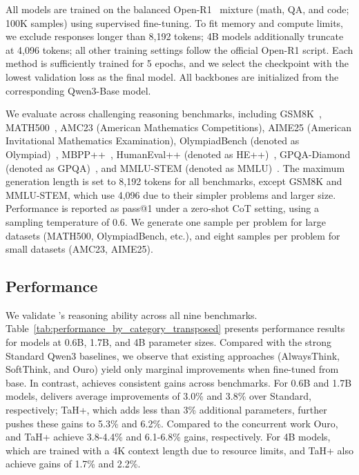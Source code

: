 All models are trained on the balanced Open-R1~\citep{openr1} mixture (math, QA, and code; 100K samples) using supervised fine-tuning. 
To fit memory and compute limits, we exclude responses longer than 8,192 tokens; 4B models additionally truncate at 4,096 tokens; all other training settings follow the official Open-R1 script.
Each method is sufficiently trained for 5 epochs, and we select the checkpoint with the lowest validation loss as the final model. 
All backbones are initialized from the corresponding Qwen3-Base model.


\label{sec:eval_setup}
We evaluate across challenging reasoning benchmarks, including GSM8K~\citep{cobbe2021training}, MATH500~\citep{hendrycks2021measuring}, AMC23 (American
Mathematics Competitions), AIME25 (American Invitational Mathematics Examination), OlympiadBench (denoted as Olympiad)~\citep{he2024olympiadbench}, MBPP++~\citep{mbpp}, HumanEval++ (denoted as HE++)~\citep{humaneval}, GPQA-Diamond (denoted as GPQA)~\citep{rein2023gpqa}, and MMLU-STEM (denoted as MMLU)~\citep{mmlu}.
The maximum generation length is set to 8,192 tokens for all benchmarks, except GSM8K and MMLU-STEM, which use 4,096 due to their simpler problems and larger size.
Performance is reported as pass@1 under a zero-shot CoT setting, using a sampling temperature of 0.6.
We generate one sample per problem for large datasets (MATH500, OlympiadBench, etc.), and eight samples per problem for small datasets (AMC23, AIME25).

\subsection{Performance}
\label{sec:experiment/performance}

We validate \name's reasoning ability across all nine benchmarks.
Table~\ref{tab:performance_by_category_transposed} presents performance results for models at 0.6B, 1.7B, and 4B parameter sizes.
Compared with the strong Standard Qwen3 baselines, we observe that existing approaches (AlwaysThink,
SoftThink, and Ouro) yield only marginal improvements when fine-tuned from base.
In contrast, \name achieves consistent gains across benchmarks.
For 0.6B and 1.7B models, \name delivers average improvements of 3.0\% and 3.8\% over Standard, respectively; TaH+, which adds less than 3\% additional parameters, further pushes these gains to 5.3\% and 6.2\%.
Compared to the concurrent work Ouro, \name and TaH+ achieve 3.8-4.4\% and 6.1-6.8\% gains, respectively.
For 4B models, which are trained with a 4K context length due to resource limits, \name and TaH+ also achieve gains of 1.7\% and 2.2\%.

